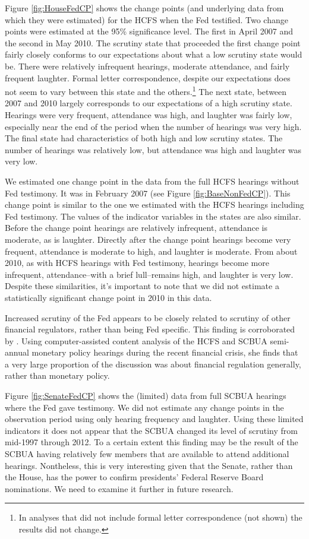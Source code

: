 \documentclass[a4paper]{article}\usepackage[]{graphicx}\usepackage[]{color}
\begin{document}
Figure \ref{fig:HouseFedCP} shows the change points (and underlying data from which they were estimated) for the HCFS when the Fed testified. Two change points were estimated at the 95\% significance level. The first in April 2007 and the second in May 2010. The scrutiny state that proceeded the first change point fairly closely conforms to our expectations about what a low scrutiny state would be. There were relatively infrequent hearings, moderate attendance, and fairly frequent laughter. Formal letter correspondence, despite our expectations does not seem to vary between this state and the others.\footnote{In analyses that did not include formal letter correspondence (not shown) the results did not change.} The next state, between 2007 and 2010 largely corresponds to our expectations of a high scrutiny state. Hearings were very frequent, attendance was high, and laughter was fairly low, especially near the end of the period when the number of hearings was very high. The final state had characteristics of both high and low scrutiny states. The number of hearings was relatively low, but attendance was high and laughter was very low.

We estimated one change point in the data from the full HCFS hearings without Fed testimony. It was in February 2007 (see Figure \ref{fig:BaseNonFedCP}). This change point is similar to the one we estimated with the HCFS hearings including Fed testimony. The values of the indicator variables in the states are also similar. Before the change point hearings are relatively infrequent, attendance is moderate, as is laughter. Directly after the change point hearings become very frequent, attendance is moderate to high, and laughter is moderate. From about 2010, as with HCFS hearings with Fed testimony, hearings become more infrequent, attendance--with a brief lull--remains high, and laughter is very low. Despite these similarities, it's important to note that we did not estimate a statistically significant change point in 2010 in this data.

Increased scrutiny of the Fed appears to be closely related to scrutiny of other financial regulators, rather than being Fed specific. This finding is corroborated by \cite{SchonhardtBailey2012}. Using computer-assisted content analysis of the HCFS and SCBUA semi-annual monetary policy hearings during the recent financial crisis, she finds that a very large proportion of the discussion was about financial regulation generally, rather than monetary policy.

Figure \ref{fig:SenateFedCP} shows the (limited) data from full SCBUA hearings where the Fed gave testimony. We did not estimate any change points in the observation period using only hearing frequency and laughter. Using these limited indicators it does not appear that the SCBUA changed its level of scrutiny from mid-1997 through 2012. To a certain extent this finding may be the result of the SCBUA having relatively few members that are available to attend additional hearings. Nontheless, this is very interesting given that the Senate, rather than the House, has the power to confirm presidents' Federal Reserve Board nominations. We need to examine it further in future research.
\end{document}
